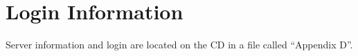 \chapter{Login Information}
\label{app:logininfo}
Server information and login are located on the CD in a file called ``Appendix D''.